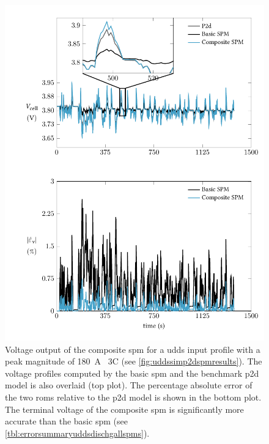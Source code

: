\begin{figure}[!htbp]
    \centering
    \includegraphics{chapters/sys_id/figures/composite_spm_vcell_udds.pdf}
    \caption[%
    Terminal voltage output of --- \emph{a}) the  model, \emph{b}) the
    basic , and \emph{c}) the composite  for a
     input profile
    ]%
    {%
        Voltage output of the composite \gls{spm} for a \gls{udds} input profile
        with a peak magnitude of \SI{180}{\ampere} \ie~3C
        (see \cref{fig:uddssimp2dspmresults}). The voltage
        profiles computed by the basic \gls{spm} and the benchmark \gls{p2d}
        model is also overlaid (top plot). The percentage absolute error of the
        two \glspl{rom} relative to the \gls{p2d} model is shown in the bottom
        plot. The terminal voltage of the composite \gls{spm} is significantly
        more accurate than the basic \gls{spm}
        (see \cref{tbl:errorsummaryuddsdischgallspms}).
    }%
    \label{fig:voltageoutputcompareallSPMsudds}
\end{figure}

